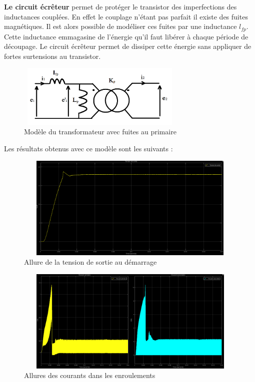 \documentclass[12pt]{article}
\begin{document}
\textbf{Le circuit écrêteur  } permet de protéger le transistor des imperfections des inductances couplées. En effet le couplage n'étant pas parfait il existe des fuites magnétiques. Il est alors possible de modéliser ces fuites par une inductance $l_{fp}$. Cette inductance emmagasine de l'énergie qu'il faut libérer à chaque période de découpage. Le circuit écrêteur permet de dissiper cette énergie sans appliquer de fortes surtensions au transistor.

 
\begin{figure}[!h]
  \centering
  \includegraphics[width=8cm,height = 3cm,trim=0cm 0cm 0cm 0cm, clip=true]{Images_Rapport/multon}
  
  
  \caption{Modèle du transformateur avec fuites au primaire \cite{Multon}}
  
\end{figure}

\vspace{15pt}

Les résultats obtenus avec ce modèle sont les suivants : 
 
 
\begin{figure}[!h]
\hspace{-40pt}
\includegraphics[width=19cm,height = 5cm,trim=0cm 0cm 0cm 0cm, clip=true]{Images_Rapport/t}
\caption{Allure de la tension de sortie au démarrage}
\end{figure}
 
\vspace{10pt} 
\begin{figure}[!h]
\hspace{-40pt}
\includegraphics[width=19cm,height = 5cm,trim=0cm 0cm 0cm 0cm, clip=true]{Images_Rapport/c}
\caption{Allures des courants dans les enroulements}
\end{figure}  
  \vspace{10pt}
  
\end{document}
